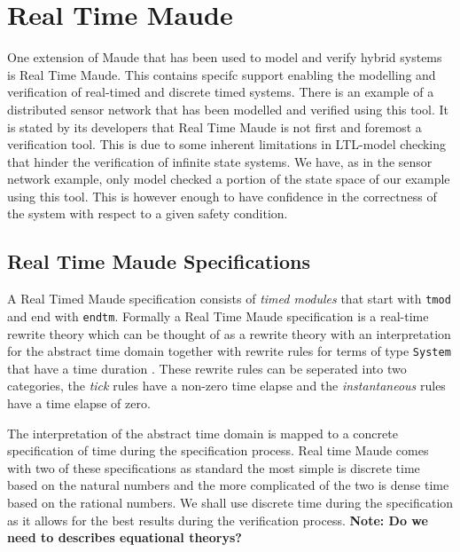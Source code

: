 \section{Real Time Maude}
One extension of Maude that has been used to model and verify hybrid systems is Real Time Maude. This contains specifc support enabling the modelling and verification of real-timed and discrete timed systems. There is an example of a distributed sensor network that has been modelled and verified using this tool. It is stated by its developers that Real Time Maude is not first and foremost a verification tool. This is due to some inherent limitations in LTL-model checking that hinder the verification of infinite state systems. We have, as in the sensor network example, only model checked a portion of the state space of our example using this tool. This is however enough to have confidence in the correctness of the system with respect to a given safety condition.




\subsection{Real Time Maude Specifications}
A Real Timed Maude specification consists of \emph{timed modules} that start with \texttt{tmod} and end with \texttt{endtm}. Formally a Real Time Maude specification is a real-time rewrite theory which can be thought of as a rewrite theory with an interpretation for the abstract time domain together with rewrite rules for terms of type \texttt{System} that have a time duration \cite{PO02}. These rewrite rules can be seperated into two categories, the \emph{tick} rules have a non-zero time elapse and the \emph{instantaneous} rules have a time elapse of zero.

The interpretation of the abstract time domain is mapped to a concrete specification of time during the specification process. Real time Maude comes with two of these specifications as standard the most simple  is discrete time based on the natural numbers and the more complicated of the two is dense time based on the rational numbers. We shall use discrete time during the specification as it allows for the best results during the verification process. \textbf{Note: Do we need to describes equational theorys?}

